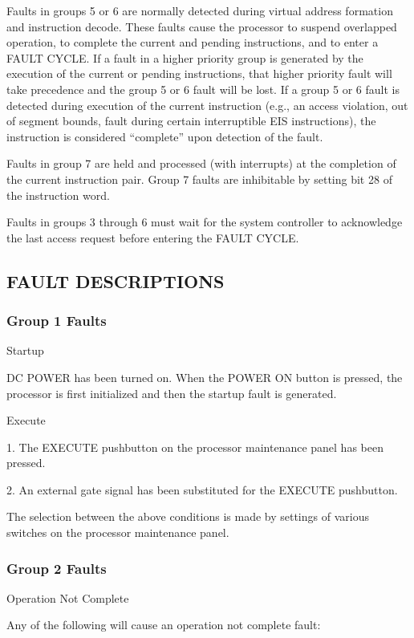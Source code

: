 Faults in groups 5 or 6 are normally detected during virtual address formation
and instruction decode. These faults cause the processor to suspend overlapped
operation, to complete the current and pending instructions, and to enter a
FAULT CYCLE. If a fault in a higher priority group is generated by the
execution of the current or pending instructions, that higher priority fault
will take precedence and the group 5 or 6 fault will be lost. If a group 5 or 6
fault is detected during execution of the current instruction (e.g., an access
violation, out of segment bounds, fault during certain interruptible EIS
instructions), the instruction is considered {``}complete'' upon detection of
the fault.


Faults in group 7 are held and processed (with interrupts) at the completion of
the current instruction pair. Group 7 faults are inhibitable by setting bit 28
of the instruction word.  

Faults in groups 3 through 6 must wait for the system controller to acknowledge the last access request before entering the FAULT CYCLE.  

\subsection{FAULT DESCRIPTIONS}

\subsubsection{Group 1 Faults}

Startup 

DC POWER has been turned on. When the POWER ON button is pressed, the processor
is first initialized and then the startup fault is generated.

Execute

1. The EXECUTE pushbutton on the processor maintenance panel has been pressed.

2. An external gate signal has been substituted for the EXECUTE pushbutton.

The selection between the above conditions is made by settings of various
switches on the processor maintenance panel.

\subsubsection{Group 2 Faults}

Operation Not Complete

Any of the following will cause an operation not complete fault:

